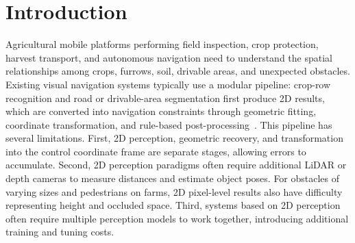 \documentclass[a4paper,fleqn]{cas-sc}
\begin{document}
\section{Introduction}\label{sec:intro}
Agricultural mobile platforms performing field inspection, crop protection, harvest transport, and autonomous navigation need to understand the spatial relationships among crops, furrows, soil, drivable areas, and unexpected obstacles. Existing visual navigation systems typically use a modular pipeline: crop-row recognition and road or drivable-area segmentation first produce 2D results, which are converted into navigation constraints through geometric fitting, coordinate transformation, and rule-based post-processing~\citep{nkwochaComprehensiveReviewSensing2025,baiVisionbasedNavigationGuidance2023}.
This pipeline has several limitations. First, 2D perception, geometric recovery, and transformation into the control coordinate frame are separate stages, allowing errors to accumulate. Second, 2D perception paradigms often require additional LiDAR or depth cameras to measure distances and estimate object poses. For obstacles of varying sizes and pedestrians on farms, 2D pixel-level results also have difficulty representing height and occluded space. Third, systems based on 2D perception often require multiple perception models to work together, introducing additional training and tuning costs.
\end{document}
